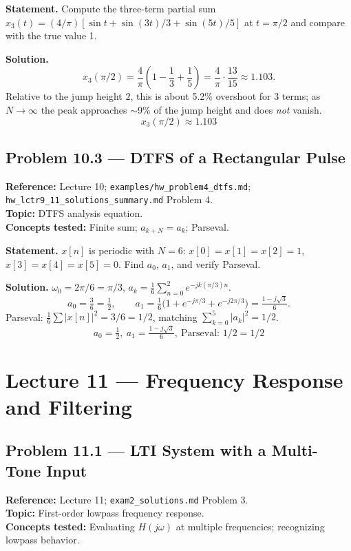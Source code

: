 \documentclass[11pt]{article}
\begin{document}
\textbf{Statement.} Compute the three-term partial sum $x_3(t) = (4/\pi)[\sin t + \sin(3t)/3 + \sin(5t)/5]$ at $t=\pi/2$ and compare with the true value 1.

\textbf{Solution.}
\[
x_3(\pi/2) = \frac{4}{\pi}\left(1 - \frac{1}{3} + \frac{1}{5}\right) = \frac{4}{\pi}\cdot\frac{13}{15} \approx 1.103.
\]
Relative to the jump height $2$, this is about 5.2\% overshoot for 3 terms; as $N\to\infty$ the peak approaches $\sim$9\% of the jump height and does \emph{not} vanish.
\[
\boxed{\,x_3(\pi/2)\approx 1.103\,}
\]

\subsection{Problem 10.3 --- DTFS of a Rectangular Pulse}
\textbf{Reference:} Lecture 10; \texttt{examples/hw\_problem4\_dtfs.md}; \texttt{hw\_lctr9\_11\_solutions\_summary.md} Problem 4.\\
\textbf{Topic:} DTFS analysis equation.\\
\textbf{Concepts tested:} Finite sum; $a_{k+N}=a_k$; Parseval.

\textbf{Statement.} $x[n]$ is periodic with $N=6$: $x[0]=x[1]=x[2]=1$, $x[3]=x[4]=x[5]=0$. Find $a_0$, $a_1$, and verify Parseval.

\textbf{Solution.}
$\omega_0 = 2\pi/6 = \pi/3$, $a_k = \tfrac{1}{6}\sum_{n=0}^2 e^{-jk(\pi/3)n}$.
\[
a_0 = \tfrac{3}{6} = \tfrac{1}{2},\qquad
a_1 = \tfrac{1}{6}\bigl(1 + e^{-j\pi/3} + e^{-j2\pi/3}\bigr) = \tfrac{1-j\sqrt{3}}{6}.
\]
Parseval: $\tfrac{1}{6}\sum|x[n]|^2 = 3/6 = 1/2$, matching $\sum_{k=0}^5|a_k|^2 = 1/2$.
\[
\boxed{\,a_0=\tfrac12,\ a_1=\tfrac{1-j\sqrt{3}}{6},\ \text{Parseval: }1/2=1/2\,}
\]

\section{Lecture 11 --- Frequency Response and Filtering}

\subsection{Problem 11.1 --- LTI System with a Multi-Tone Input}
\textbf{Reference:} Lecture 11; \texttt{exam2\_solutions.md} Problem 3.\\
\textbf{Topic:} First-order lowpass frequency response.\\
\textbf{Concepts tested:} Evaluating $H(j\omega)$ at multiple frequencies; recognizing lowpass behavior.
\end{document}
